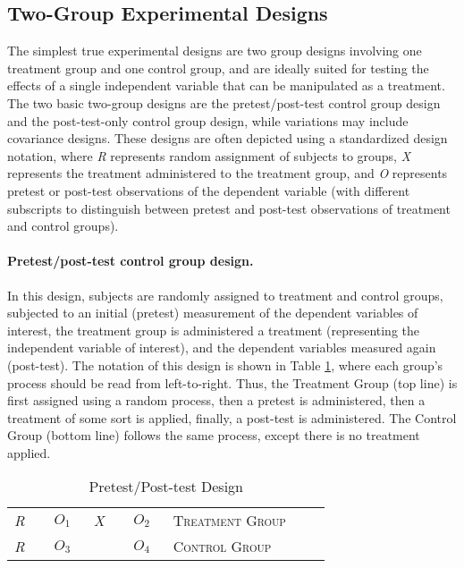 \subsection{Two-Group Experimental Designs}

The simplest true experimental designs are two group designs involving one treatment group and one control group, and are ideally suited for testing the effects of a single independent variable that can be manipulated as a treatment. The two basic two-group designs are the pretest/post-test control group design and the post-test-only control group design, while variations may include covariance designs. These designs are often depicted using a standardized design notation, where \textit{R} represents random assignment of subjects to groups, \textit{X} represents the treatment administered to the treatment group, and \textit{O} represents pretest or post-test observations of the dependent variable (with different subscripts to distinguish between pretest and post-test observations of treatment and control groups).

\paragraph{Pretest/post-test control group design.} In this design, subjects are randomly assigned to treatment and control groups, subjected to an initial (pretest) measurement of the dependent variables of interest, the treatment group is administered a treatment (representing the independent variable of interest), and the dependent variables measured again (post-test). The notation of this design is shown in Table \ref{09:tab01}, where each group's process should be read from left-to-right. Thus, the Treatment Group (top line) is first assigned using a random process, then a pretest is administered, then a treatment of some sort is applied, finally, a post-test is administered. The Control Group (bottom line) follows the same process, except there is no treatment applied.

\begin{table}[H]
	\centering
	\begin{tabularx}{0.85\linewidth}{p{0.10\linewidth}p{0.10\linewidth}p{0.10\linewidth}p{0.10\linewidth}p{0.40\linewidth}}
		\toprule
		\textit{R} & $ O_1 $ & \textit{X} & $ O_2 $ & \textsc{Treatment Group} \\
		\textit{R} & $ O_3 $ &            & $ O_4 $ & \textsc{Control Group} \\
		\bottomrule
	\end{tabularx}
	\caption{Pretest/Post-test Design}
	\label{09:tab01}
\end{table}

